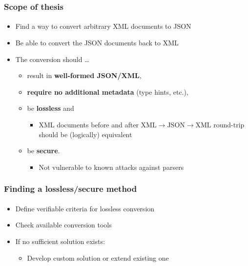 \documentclass[
    alternativetitlepage=alternativ,
    cornerlogo=hgi_nds_logo2,
    sectionoverview,
]{rubpresentation}
\begin{document}
\begin{frame}
    \frametitle{Scope of thesis}
    \framesubtitle{}
    \begin{itemize}
        \item{} Find a way to convert arbitrary XML documents to JSON\\
        \item{} Be able to convert the JSON documents back to XML\\
        \item{} The conversion should \ldots\
            \begin{itemize}
                \item{} result in \textbf{well-formed JSON/XML},
                \item{} \textbf{require no additional metadata} (type hints, etc.),\\
                \item{} be \textbf{lossless} and
                    \begin{itemize}
                        \item{} XML documents before and after %
                                $\text{XML}\rightarrow\text{JSON}\rightarrow\text{XML}$ %
                                round-trip should be (logically) equivalent\\
                    \end{itemize}
                \item{} be \textbf{secure}.
                    \begin{itemize}
                        \item{} Not vulnerable to known attacks against parsers\\
                    \end{itemize}
            \end{itemize}
    \end{itemize}
\end{frame}

\begin{frame}
  \frametitle{Finding a lossless/secure method}
  \framesubtitle{}
  \begin{itemize}
    \item{} Define verifiable criteria for lossless conversion
    \item{} Check available conversion tools
    \item{} If no sufficient solution exists:
      \begin{itemize}
        \item{} Develop custom solution or extend existing one
      \end{itemize}
  \end{itemize}
\end{frame}
\end{document}

